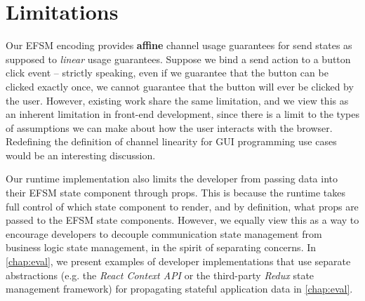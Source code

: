 \section{Limitations}
Our EFSM encoding provides \textbf{affine} channel
usage guarantees for send states as supposed to \textit{linear} usage
guarantees. Suppose we bind a send action to a
button click event -- strictly speaking,
even if we guarantee that the button can be clicked exactly once,
we cannot guarantee that the button will ever be clicked by the user.
However, existing work \cite{PureScript2019,MVU2020} 
share the same limitation, and we view this as an
inherent limitation in front-end development, since there is
a limit to the types of assumptions we can make about how the
user interacts with the browser.
Redefining the definition of channel linearity 
for GUI programming use cases
would be an interesting discussion.

Our runtime implementation also limits the developer from
passing data into their EFSM state component through props.
This is because the runtime takes full control of which
state component to render, and by definition, what props 
are passed to the EFSM state components.
However, we equally view this as a way to encourage developers
to decouple communication state management from
business logic state management, in the spirit
of separating concerns.
In \cref{chap:eval},
we present examples of developer implementations
that use separate abstractions (e.g. the \textit{React Context API} or
the third-party \textit{Redux} state management framework) for propagating 
stateful application data in \cref{chap:eval}.